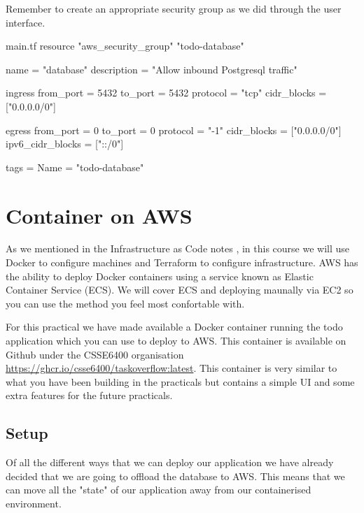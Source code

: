 \documentclass{csse4400}
\begin{document}
\noindent Remember to create an appropriate security group as we did through the user interface.

\begin{code}[language=terraform,numbers=none]{main.tf}
resource "aws_security_group" "todo-database" {
  name        = "database"
  description = "Allow inbound Postgresql traffic"

  ingress {
    from_port        = 5432
    to_port          = 5432
    protocol         = "tcp"
    cidr_blocks      = ["0.0.0.0/0"]
  }

  egress {
    from_port        = 0
    to_port          = 0
    protocol         = "-1"
    cidr_blocks      = ["0.0.0.0/0"]
    ipv6_cidr_blocks = ["::/0"]
  }

  tags = {
    Name = "todo-database"
  }
}
\end{code}


\section{Container on AWS}

As we mentioned in the Infrastructure as Code notes \cite{iac-notes},
in this course we will use Docker to configure machines and Terraform to configure infrastructure.
AWS has the ability to deploy Docker containers using a service known as Elastic Container Service (ECS). We will cover ECS and deploying maunally via EC2 so you can use the method you feel most confortable with.

For this practical we have made available a Docker container running the todo application which you can use to deploy to AWS. This container is available on Github under the CSSE6400 organisation \url{https://ghcr.io/csse6400/taskoverflow:latest}. This container is very similar to what you have been building in the practicals but contains a simple UI and some extra features for the future practicals.

\subsection{Setup}

Of all the different ways that we can deploy our application we have already decided that we are going to offload the database to AWS. This means that we can move all the "state" of our application away from our containerised environment.
\end{document}
